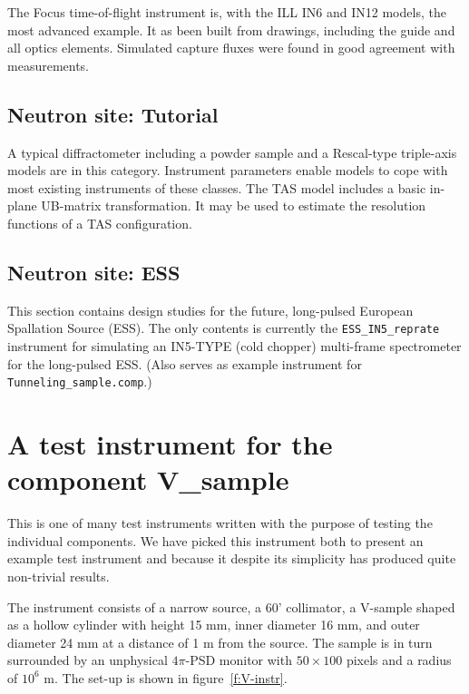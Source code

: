 The Focus time-of-flight instrument is, with the ILL IN6 and IN12 models, the most advanced example. It as been built from drawings, including the guide and all optics elements. Simulated capture fluxes were found in good agreement with measurements.

\subsection{Neutron site: Tutorial}

A typical diffractometer including a powder sample and a Rescal-type triple-axis models are in this category. Instrument parameters enable models to cope with most existing instruments of these classes. The TAS model includes a basic in-plane UB-matrix transformation. It may be used to estimate the resolution functions of a TAS configuration.

\subsection{Neutron site: ESS}

This section contains design studies for the future, long-pulsed European
Spallation Source (ESS). The only contents is currently the
\verb+ESS_IN5_reprate+ instrument for simulating an IN5-TYPE (cold chopper)
multi-frame spectrometer for the long-pulsed ESS. (Also serves as example
instrument for \verb+Tunneling_sample.comp+.)

\section{A test instrument for the component V\_sample}
\label{s:V-instr}
This is one of many test instruments written with the
purpose of testing the individual components. We have picked
this instrument both to present an
example test instrument and because it despite its simplicity
has produced quite non-trivial results.

The instrument consists of a narrow source,
a 60' collimator, a V-sample shaped as a hollow cylinder
with height 15 mm, inner diameter 16 mm, and outer diameter 24 mm
at a distance of 1 m from the source.
The sample is in turn surrounded by an unphysical $4\pi$-PSD
monitor with $50 \times 100$ pixels and a radius of $10^{6}$ m.
The set-up is shown in figure~\ref{f:V-instr}.

